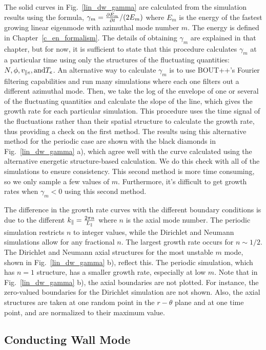 The solid curves in Fig.~\ref{lin_dw_gamma} are calculated from the simulation results using the formula, $\gamma_m = \frac{\partial E_m}{\partial t}/(2 E_m)$ where $E_m$ is the energy of the fastest
growing linear eigenmode with azimuthal mode number $m$.
The energy is defined in Chapter~\ref{c_en_formalism}. The details of obtaining $\gamma_m$ are explained in that chapter, but for now, it is sufficient to state that this procedure calculates
$\gamma_m$ at a particular time using only the structures of the fluctuating quantities: $N, \phi, v_{\parallel e}, {\rm and } T_e$. An alternative way to calculate $\gamma_m$ is to use BOUT++'s Fourier
filtering capabilities and run many simulations where each one filters out a different azimuthal mode. Then, we take the log of the envelope of one or several of the fluctuating quantities
and calculate the slope of the line, which gives the growth rate for each particular simulation. This procedure uses the time signal of the fluctuations rather than their spatial structure to
calculate the growth rate, thus providing a check on the first method. 
The results using this alternative method for the periodic case are shown with the black diamonds in Fig.~\ref{lin_dw_gamma} a), which agree well with the curve calculated using the 
alternative energetic structure-based calculation. We do this check with all of the simulations to ensure consistency. This second method is more time consuming, so we only sample a few values of $m$.
Furthermore, it's difficult to get growth rates when $\gamma_m < 0$ using this second method.

The difference in the growth rate curves with the different boundary conditions is due to the different $k_\parallel = \frac{2 \pi n}{L_\parallel}$ where $n$ is the axial mode number. The periodic simulation
restricts $n$ to integer values, while the Dirichlet and Neumann simulations allow for any fractional $n$. The largest growth rate occurs for $n \sim 1/2$. The Dirichlet and Neumann axial structures
for the most unstable $m$ mode, shown in Fig.~\ref{lin_dw_gamma} b), reflect this. The periodic simulation, which has $n=1$ structure, has a smaller growth rate, especially at low $m$. Note that in
Fig.~\ref{lin_dw_gamma} b), the axial boundaries are not plotted. For instance, the zero-valued boundaries for the Dirichlet simulation are not shown. Also, the axial structures are taken at one
random point in the $r-\theta$ plane and at one time point, and are normalized to their maximum value.

\subsection{Conducting Wall Mode}
\label{ss_cwm}

